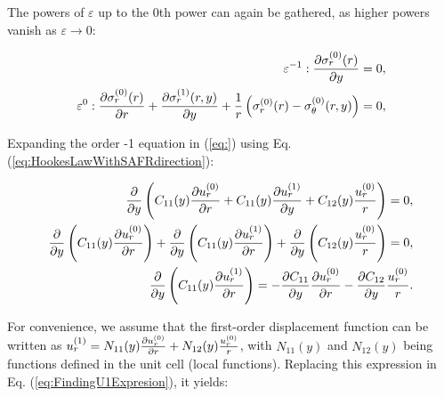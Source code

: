 The powers of $\varepsilon$ up to the 0th power can again be gathered, as higher powers vanish as $\varepsilon \rightarrow 0$:

\begin{equation}
    \begin{aligned} \label{eq:EquilibriumWithStressSAFs}
        \varepsilon^{-1}: \frac{\partial \sigma_r^{(0)}(r)}{\partial y} = 0,\\
        \varepsilon^{0}: \frac{\partial \sigma_r^{(0)}(r)}{\partial r} + \frac{\partial \sigma_r^{(1)}(r,y)}{\partial y} + \frac{1}{r} \left(  \sigma_r^{(0)}(r) - \sigma_{\theta}^{(0)}(r,y) \right) = 0,
        \end{aligned}
\end{equation}

Expanding the order -1 equation in (\ref{eq:}) using Eq. (\ref{eq:HookesLawWithSAFRdirection}):

\begin{equation}
    \begin{aligned} \label{eq:FindingU1Expresion}
        \frac{\partial }{\partial y} \left( C_{11}(y) \frac{\partial u_r^{(0)}}{\partial r} + C_{11}(y) \frac{\partial u_r^{(1)}}{\partial y} + C_{12}(y)\frac{u_r^{(0)}}{r}\right) = 0 ,\\
        \frac{\partial }{\partial y} \left( C_{11}(y) \frac{\partial u_r^{(0)}}{\partial r} \right) + 
        \frac{\partial }{\partial y} \left( C_{11}(y) \frac{\partial u_r^{(1)}}{\partial r} \right) + 
        \frac{\partial }{\partial y} \left( C_{12}(y)\frac{u_r^{(0)}}{r} \right) = 0,\\
        \frac{\partial }{\partial y} \left( C_{11}(y) \frac{\partial u_r^{(1)}}{\partial r} \right) = -\frac{\partial C_{11}}{\partial y}\frac{\partial u_r^{(0)}}{\partial r} - \frac{\partial C_{12}}{\partial y}\frac{u_r^{(0)}}{r}. 
    \end{aligned}
\end{equation}

For convenience, we assume that the first-order displacement function can be written as $ u_r^{(1)} = N_{11}(y) \frac{\partial u_r^{(0)}}{\partial r} + N_{12}(y)\frac{u_r^{(0)}}{r} $, with $N_{11}(y)$ and $N_{12}(y)$ being functions defined in the unit cell (local functions). Replacing this expression in Eq. (\ref{eq:FindingU1Expresion}), it yields:

